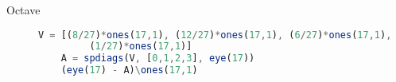\begin{description}
\begin{lstlisting}[language=R]
\end{lstlisting}  

\item[Octave]


\begin{lstlisting}[language=Octave]
    V = [(8/27)*ones(17,1), (12/27)*ones(17,1), (6/27)*ones(17,1),
         (1/27)*ones(17,1)]
    A = spdiags(V, [0,1,2,3], eye(17))
    (eye(17) - A)\ones(17,1)
\end{lstlisting}









\end{description}



